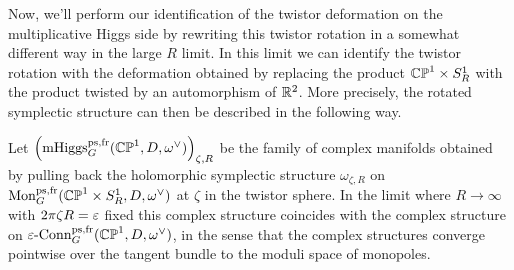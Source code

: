 \documentclass[10pt, oneside]{article}
\DeclareMathOperator{\mhiggs}{mHiggs}
\DeclareMathOperator{\mon}{Mon}
\newcommand{\epsconn}{\varepsilon\text{-Conn}}
\newcommand{\fr}{\mathrm{fr}}
\begin{document}
Now, we'll perform our identification of the twistor deformation on the multiplicative Higgs side by rewriting this twistor rotation in a somewhat different way in the large $R$ limit.  In this limit we can identify the twistor rotation with the deformation obtained by replacing the product $\mathbb{CP}^1 \times S^1_R$ with the product twisted by an automorphism of $\mathbb{R}^2$.  More precisely, the rotated symplectic structure can then be described in the following way.

\begin{theorem}
Let $\left(\mhiggs^{\text{ps,fr}}_G(\bb{CP}^1,D,\omega^\vee)\right)_{\zeta,R}$ be the family of complex manifolds obtained by pulling back the holomorphic symplectic structure $\omega_{\zeta,R}$ on $\mon_G^{\mr{ps},\fr}(\bb{CP}^1 \times S^1_R,D,\omega^\vee)$ at $\zeta$ in the twistor sphere.  In the limit where $R \to \infty$ with $2 \pi \zeta R = \varepsilon$ fixed this complex structure coincides with the complex structure on $\epsconn^{\text{ps,fr}}_G(\bb{CP}^1,D,\omega^\vee)$, in the sense that the complex structures converge pointwise over the tangent bundle to the moduli space of monopoles. 
\end{theorem}
\end{document}

